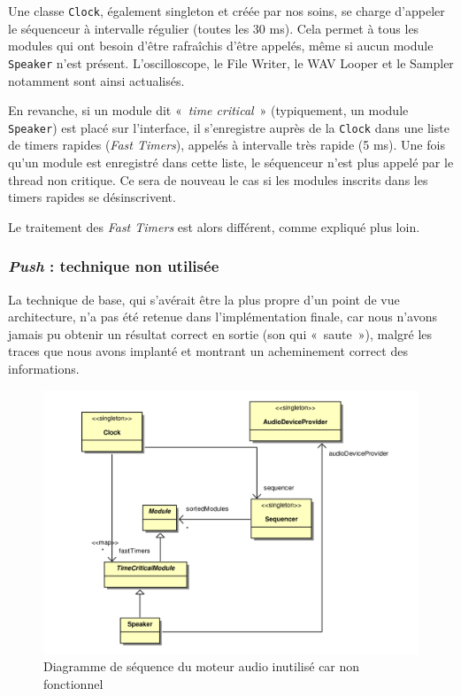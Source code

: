 Une classe \verb!Clock!, également singleton et créée par nos
soins, se charge d'appeler le séquenceur à intervalle régulier
(toutes les 30 ms). Cela permet à tous les modules qui ont besoin
d'être rafraîchis d'être appelés, même si aucun module
\verb!Speaker! n'est présent. L'oscilloscope, le File Writer, le
WAV Looper et le Sampler notamment sont ainsi actualisés.

En revanche, si un module dit «~\emph{time critical}~»
(typiquement, un module \verb!Speaker!) est placé sur l'interface,
il s'enregistre auprès de la \verb!Clock! dans une liste de timers
rapides (\emph{Fast Timers}), appelés à intervalle très rapide (5
ms). Une fois qu'un module est enregistré dans cette liste, le
séquenceur n'est plus appelé par le thread non critique. Ce sera de nouveau le
cas si les modules inscrits dans les timers rapides se
désinscrivent.

Le traitement des \emph{Fast Timers} est alors différent, comme
expliqué plus loin.

\subsubsection{\emph{Push} : technique non utilisée}

La technique de base, qui s'avérait être la plus propre d'un point
de vue architecture, n'a pas été retenue dans l'implémentation
finale, car nous n'avons jamais pu obtenir un résultat correct en
sortie (son qui «~saute~»), malgré les traces que nous avons
implanté et montrant un acheminement correct des informations.

\begin{figure}[ht]
\centering
\includegraphics[width=17cm]{../img/ps/psm_unusedAudioEngine.pdf}
\caption{Diagramme de séquence du moteur audio inutilisé car non fonctionnel}
\label{fig:unused-audioengine}
\end{figure}

